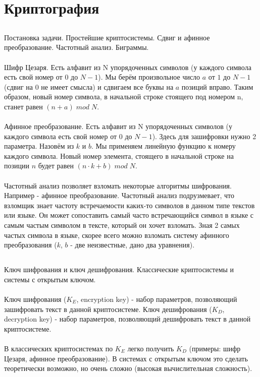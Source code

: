 \documentclass[a4paper,10pt]{article} %
\begin{document}
	\section{Криптография}
	\subsection{}
	Постановка задачи. Простейшие криптосистемы. Сдвиг и афинное преобразование.
	Частотный анализ. Биграммы.
	\\\\
	Шифр Цезаря. Есть алфавит из N упорядоченных символов (у каждого символа есть свой номер от $0$ до $N - 1$). Мы берём произвольное число $a$ от $1$ до $N - 1$ (сдвиг на 0 не имеет смысла) и сдвигаем все буквы на $a$ позиций вправо. Таким образом, новый номер символа, в начальной строке стоящего под номером n, станет равен $(n + a) \; mod \; N$.
	\\\\
	Афинное преобразование. Есть алфавит из N упорядоченных символов (у каждого символа есть свой номер от $0$ до $N - 1$). Здесь для зашифровки нужно 2 параметра. Назовём из $k$ и $b$. Мы применяем линейную функцию к номеру каждого символа. Новый номер элемента, стоящего в начальной строке на позиции $n$ будет равен $(n \cdot k + b) \; mod \; N$.
	\\\\
	Частотный анализ позволяет взломать некоторые алгоритмы шифрования. Например - афинное преобразование. Частотный анализ подрузмевает, что взломщик знает частоту встречаемости каких-то символов в данном типе текстов или языке. Он может сопоставить самый часто встречающийся символ в языке с самым частым символом в тексте, который он хочет взломать. Зная 2 самых частых символа в языке, скорее всего можно взломать систему афинного преобразования ($k$, $b$ - две неизвестные, дано два уравнения).
	
	\subsection{}
	Ключ шифрования и ключ дешифрования. Классические криптосистемы и системы с открытым ключом.
	\\\\
	Ключ шифрования ($K_{E}$, encryption key) - набор параметров, позволяющий зашифровать текст в данной криптосистеме. Ключ дешифрования ($K_{D}$, decryption key) - набор параметров, позволяющий дешифровать текст в данной криптосистеме.
	\\\\
	В классических криптосистемах по $K_{E}$ легко получить $K_{D}$ (примеры: шифр Цезаря, афинное преобразование). В системах с открытым ключом это сделать теоретически возможно, но очень сложно (высокая вычислительная сложность).
\end{document}
